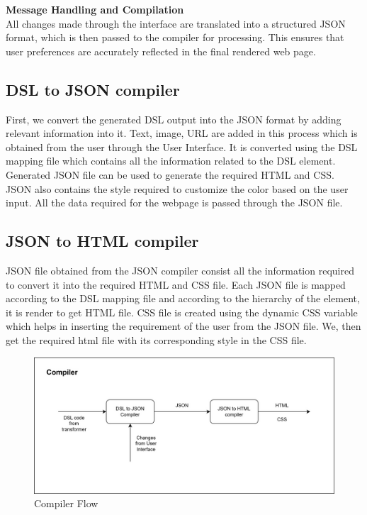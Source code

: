 \textbf{Message Handling and Compilation}\\
All changes made through the interface are translated into a structured JSON format, which is then passed to the compiler for processing. This ensures that user preferences are accurately reflected in the final rendered web page.

\subsection{DSL to JSON compiler}
First, we convert the generated DSL output into the JSON format by adding relevant information into it. Text, image, URL are added in this process which is obtained from the user through the User Interface. It is converted using the DSL mapping file which contains all the information related to the DSL element. Generated JSON file can be used to generate the required HTML and CSS. JSON also contains the style required to customize the color based on the user input. All the data required for the webpage is passed through the JSON file.
\subsection{JSON to HTML compiler}
JSON file obtained from the JSON compiler consist all the information required to convert it into the required HTML and CSS file. Each JSON file is mapped according to the DSL mapping file and according to the hierarchy of the element, it is render to get HTML file. CSS file is created using the dynamic CSS variable which helps in inserting the requirement of the user from the JSON file. We, then get the required html file with its corresponding style in the CSS file.

\begin{figure}[H]
    \centering
           \includegraphics[scale=0.15, trim=100 200 200 0]{images/compiler flow.jpeg}
           \caption{Compiler Flow}
           \label{fig:Compflow}
       \end{figure}
   
